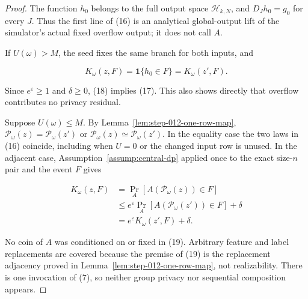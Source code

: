 \begin{proof}
The function \(h_0\) belongs to the full output space
\(\mathcal H_{k,N}\), and \(D_Jh_0=g_0\) for every \(J\).  Thus the first
line of (16) is an analytical global-output lift of the simulator's actual
fixed overflow output; it does not call \(A\).

If \(U(\omega)>M\), the seed fixes the same branch for both inputs, and

\[
  K_\omega(z,F)=\mathbf1\{h_0\in F\}=K_\omega(z',F).
\tag{18}
\]

Since \(e^\varepsilon\ge1\) and \(\delta\ge0\), (18) implies (17).  This
also shows directly that overflow contributes no privacy residual.

Suppose \(U(\omega)\le M\).  By
Lemma~\ref{lem:step-012-one-row-map},
\(\mathcal P_\omega(z)=\mathcal P_\omega(z')\) or
\(\mathcal P_\omega(z)\simeq\mathcal P_\omega(z')\).  In the equality
case the two laws in (16) coincide, including when \(U=0\) or the changed
input row is unused.  In the adjacent case, Assumption~\ref{assump:central-dp}
applied once to the exact size-\(n\) pair and the event \(F\) gives

\[
\begin{aligned}
  K_\omega(z,F)
  &=\Pr_A[A(\mathcal P_\omega(z))\in F]\\
  &\le e^\varepsilon
    \Pr_A[A(\mathcal P_\omega(z'))\in F]+\delta\\
  &=e^\varepsilon K_\omega(z',F)+\delta.
\end{aligned}
\tag{19}
\]

No coin of \(A\) was conditioned on or fixed in (19).  Arbitrary feature
and label replacements are covered because the premise of (19) is the
replacement adjacency proved in Lemma~\ref{lem:step-012-one-row-map}, not
realizability.  There is one invocation of (7), so neither group privacy
nor sequential composition appears. \end{proof}

